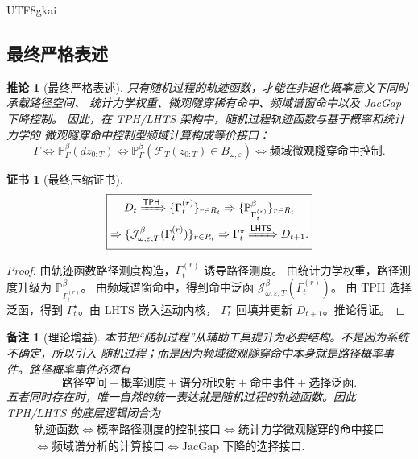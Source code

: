\documentclass[12pt]{article}
\newtheorem{corollary}{推论}[section]
\newtheorem{remark}{备注}[section]
\newtheorem{Certificate}{证书}[section]
\newcommand{\LHTS}{\ensuremath{\mathsf{LHTS}}}
\newcommand{\TPH}{\ensuremath{\mathsf{TPH}}}
\newcommand{\Prob}{\mathbb P}
\begin{document}
\begin{CJK*}{UTF8}{gkai}
\subsection{最终严格表述}
\label{subsec:final-strict-interface-statement}

\begin{corollary}[最终严格表述]
只有随机过程的轨迹函数，才能在非退化概率意义下同时承载路径空间、
统计力学权重、微观隧穿稀有命中、频域谱窗命中以及 JacGap 下降控制。
因此，在 TPH/LHTS 架构中，随机过程轨迹函数与基于概率和统计力学的
微观隧穿命中控制型频域计算构成等价接口：
\[
\boxed{
\Gamma
\Longleftrightarrow
\Prob_\Gamma^\beta(dz_{0:T})
\Longleftrightarrow
\Prob_\Gamma^\beta
\left(
\mathscr F_T(z_{0:T})\in B_{\omega,\varepsilon}
\right)
\Longleftrightarrow
\text{频域微观隧穿命中控制}.
}
\]
\end{corollary}

\begin{Certificate}[最终压缩证书]
\[
\boxed{
\begin{gathered}
D_t
\xRightarrow{\TPH}
\{\Gamma_t^{(r)}\}_{r\in R_t}
\Rightarrow
\{\Prob_{\Gamma_t^{(r)}}^\beta\}_{r\in R_t}
\\
\Rightarrow
\{\mathcal J_{\omega,\varepsilon,T}^{\beta}(\Gamma_t^{(r)})\}_{r\in R_t}
\Rightarrow
\Gamma_t^\star
\xRightarrow{\LHTS}
D_{t+1}.
\end{gathered}
}
\]
\end{Certificate}

\begin{proof}
由轨迹函数路径测度构造，\(\Gamma_t^{(r)}\) 诱导路径测度。
由统计力学权重，路径测度升级为 \(\Prob_{\Gamma_t^{(r)}}^\beta\)。
由频域谱窗命中，得到命中泛函
\(\mathcal J_{\omega,\varepsilon,T}^{\beta}(\Gamma_t^{(r)})\)。
由 TPH 选择泛函，得到 \(\Gamma_t^\star\)。由 LHTS 嵌入运动内核，
\(\Gamma_t^\star\) 回填并更新 \(D_{t+1}\)。推论得证。
\end{proof}

\begin{remark}[理论增益]
本节把“随机过程”从辅助工具提升为必要结构。不是因为系统不确定，所以引入
随机过程；而是因为频域微观隧穿命中本身就是路径概率事件。路径概率事件必须有
\[
\boxed{
\text{路径空间}
+
\text{概率测度}
+
\text{谱分析映射}
+
\text{命中事件}
+
\text{选择泛函}.
}
\]
五者同时存在时，唯一自然的统一表达就是随机过程的轨迹函数。因此 TPH/LHTS
的底层逻辑闭合为
\[
\boxed{
\begin{gathered}
\text{轨迹函数}
\Longleftrightarrow
\text{概率路径测度的控制接口}
\Longleftrightarrow
\text{统计力学微观隧穿的命中接口}
\\
\Longleftrightarrow
\text{频域谱分析的计算接口}
\Longleftrightarrow
\text{JacGap 下降的选择接口}.
\end{gathered}
}
\]
\end{remark}


\end{CJK*}
\end{document}
